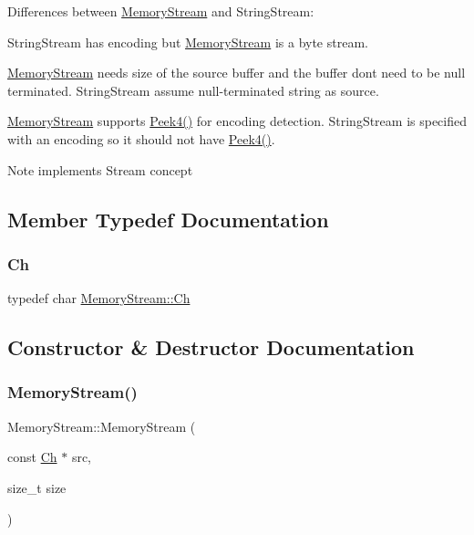 Differences between \hyperlink{structMemoryStream}{Memory\+Stream} and String\+Stream\+:
\begin{DoxyEnumerate}
\item String\+Stream has encoding but \hyperlink{structMemoryStream}{Memory\+Stream} is a byte stream.
\item \hyperlink{structMemoryStream}{Memory\+Stream} needs size of the source buffer and the buffer don\textquotesingle{}t need to be null terminated. String\+Stream assume null-\/terminated string as source.
\item \hyperlink{structMemoryStream}{Memory\+Stream} supports \hyperlink{structMemoryStream_ac63422050829d9724086363247059089}{Peek4()} for encoding detection. String\+Stream is specified with an encoding so it should not have \hyperlink{structMemoryStream_ac63422050829d9724086363247059089}{Peek4()}. \begin{DoxyNote}{Note}
implements Stream concept 
\end{DoxyNote}

\end{DoxyEnumerate}

\subsection{Member Typedef Documentation}
\mbox{\label{structMemoryStream_a62a1cbd052c325c83dbdb387d2f89088}} 
\subsubsection{\texorpdfstring{Ch}{Ch}}
{\footnotesize\ttfamily typedef char \hyperlink{structMemoryStream_a62a1cbd052c325c83dbdb387d2f89088}{Memory\+Stream\+::\+Ch}}



\subsection{Constructor \& Destructor Documentation}
\mbox{\label{structMemoryStream_a2472317ef00fcd44e5cc209e04c49756}} 
\subsubsection{\texorpdfstring{Memory\+Stream()}{MemoryStream()}}
{\footnotesize\ttfamily Memory\+Stream\+::\+Memory\+Stream (\begin{DoxyParamCaption}\item[{const \hyperlink{structMemoryStream_a62a1cbd052c325c83dbdb387d2f89088}{Ch} $\ast$}]{src,  }\item[{size\+\_\+t}]{size }\end{DoxyParamCaption})\hspace{0.3cm}{\ttfamily [inline]}}



